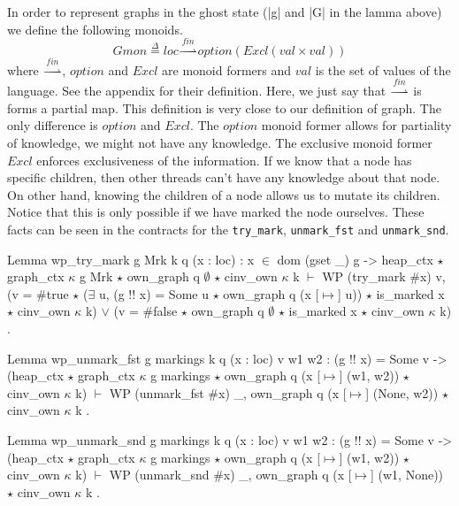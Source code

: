 \documentclass[nocopyrightspace]{sigplanconf}
\def\MyMLe{\lstinline[language=MyML, basicstyle=\small\ttfamily]}
\newcommand{\defeq}{\overset{\Delta}{=}}
\newcommand{\val}{\mathit{val}}
\newcommand{\loc}{\mathit{loc}}
\newcommand{\option}{\mathit{option}}
\newcommand{\Excl}{\mathit{Excl}}
\newcommand{\finmap}{\overset{\mathit{fin}}{\rightharpoonup}}
\begin{document}
In order to represent graphs in the ghost state (\Coqe|g| and \Coqe|G| in the lamma above) we define the following monoids.
\[
\mathit{Gmon} \defeq \loc \finmap \option(\Excl(\val \times \val))
\]
where $\finmap$, $\option$ and $\Excl$ are monoid formers and $\val$ is the set of values of the language.
See the appendix for their definition.
Here, we just say that $\finmap$ is forms a partial map.
This definition is very close to our definition of graph.
The only difference is $\option$ and $\Excl$.
The $\option$ monoid former allows for partiality of knowledge,
we might not have any knowledge.
The exclusive monoid former $\Excl$ enforces exclusiveness of the
information.
If we know that a node has specific children, then other threads
can't have any knowledge about that node.
On other hand, knowing the children of a node allows us to mutate its
children. Notice that this is only possible if we have marked the node
ourselves.
These facts can be seen in the contracts for the \MyMLe{try_mark},
\MyMLe{unmark_fst} and \MyMLe{unmark_snd}.
\begin{Coq}
Lemma wp_try_mark g Mrk k q (x : loc) : x $\in$ dom (gset _) g ->
    heap_ctx $\star$ graph_ctx $\kappa$ g Mrk $\star$ own_graph q $\emptyset$ $\star$ cinv_own $\kappa$ k
    $\vdash$ WP (try_mark $\#$x) {{ v,
         (v = $\#$true $\star$ ($\exists$ u, (g !! x) = Some u $\star$ own_graph q (x [$\mapsto$] u))
          $\star$ is_marked x $\star$ cinv_own $\kappa$ k)
           $\lor$ (v = $\#$false $\star$ own_graph q $\emptyset$ $\star$ is_marked x $\star$ cinv_own $\kappa$ k) }}.
\end{Coq}

\begin{Coq}
Lemma wp_unmark_fst g markings k q (x : loc) v w1 w2 :
    (g !! x) = Some v ->
    (heap_ctx $\star$ graph_ctx $\kappa$ g markings $\star$ own_graph q (x [$\mapsto$] (w1, w2))
     $\star$ cinv_own $\kappa$ k) $\vdash$
      WP (unmark_fst $\#$x)
      {{ _, own_graph q (x [$\mapsto$] (None, w2)) $\star$ cinv_own $\kappa$ k }}.
\end{Coq}

\begin{Coq}
Lemma wp_unmark_snd g markings k q (x : loc) v w1 w2 :
    (g !! x) = Some v ->
    (heap_ctx $\star$ graph_ctx $\kappa$ g markings $\star$ own_graph q (x [$\mapsto$] (w1, w2))
     $\star$ cinv_own $\kappa$ k) $\vdash$
      WP (unmark_snd $\#$x)
      {{ _, own_graph q (x [$\mapsto$] (w1, None)) $\star$ cinv_own $\kappa$ k }}.
\end{Coq}
\end{document}
